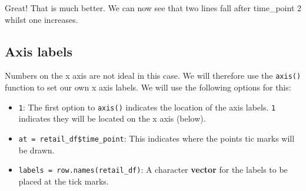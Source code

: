 \documentclass[]{book}
\newenvironment{Shaded}{\begin{snugshade}}{\end{snugshade}}
\newcommand{\KeywordTok}[1]{\textcolor[rgb]{0.13,0.29,0.53}{\textbf{#1}}}
\newcommand{\DataTypeTok}[1]{\textcolor[rgb]{0.13,0.29,0.53}{#1}}
\newcommand{\DecValTok}[1]{\textcolor[rgb]{0.00,0.00,0.81}{#1}}
\newcommand{\StringTok}[1]{\textcolor[rgb]{0.31,0.60,0.02}{#1}}
\newcommand{\CommentTok}[1]{\textcolor[rgb]{0.56,0.35,0.01}{\textit{#1}}}
\newcommand{\OperatorTok}[1]{\textcolor[rgb]{0.81,0.36,0.00}{\textbf{#1}}}
\newcommand{\NormalTok}[1]{#1}
\providecommand{\tightlist}{%
  \setlength{\itemsep}{0pt}\setlength{\parskip}{0pt}}
\begin{document}
\begin{Shaded}
\end{Shaded}

Great! That is much better. We can now see that two lines fall after
time\_point 2 whilst one increases.

\subsection{Axis labels}\label{axis-labels}

Numbers on the x axis are not ideal in this case. We will therefore use
the \texttt{axis()} function to set our own x axis labels. We will use
the following options for this:

\begin{itemize}
\tightlist
\item
  \texttt{1}: The first option to \texttt{axis()} indicates the location
  of the axis labels. \texttt{1} indicates they will be located on the x
  axis (below).
\item
  \texttt{at\ =\ retail\_df\$time\_point}: This indicates where the
  points tic marks will be drawn.
\item
  \texttt{labels\ =\ row.names(retail\_df)}: A character \textbf{vector}
  for the labels to be placed at the tick marks.
\end{itemize}
\end{document}
